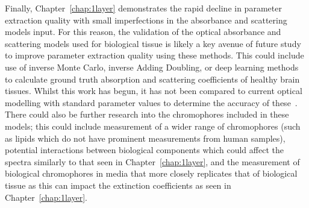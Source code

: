 Finally, Chapter~\ref{chap:1layer} demonstrates the rapid decline in parameter extraction quality with small imperfections in the absorbance and scattering models input. For this reason, the validation of the optical absorbance and scattering models used for biological tissue is likely a key avenue of future study to improve parameter extraction quality using these methods. This could include use of inverse Monte Carlo, inverse Adding Doubling, or deep learning methods to calculate ground truth absorption and scattering coefficients of healthy brain tissues. Whilst this work has begun, it has not been compared to current optical modelling with standard parameter values to determine the accuracy of these~\citep{Sabino2016, Eggert1987, Shapey2022, Hokr2021}. There could also be further research into the chromophores included in these models; this could include measurement of a wider range of chromophores (such as lipids which do not have prominent measurements from human samples), potential interactions between biological components which could affect the spectra similarly to that seen in Chapter~\ref{chap:1layer}, and the measurement of biological chromophores in media that more closely replicates that of biological tissue as this can impact the extinction coefficients as seen in Chapter~\ref{chap:1layer}.